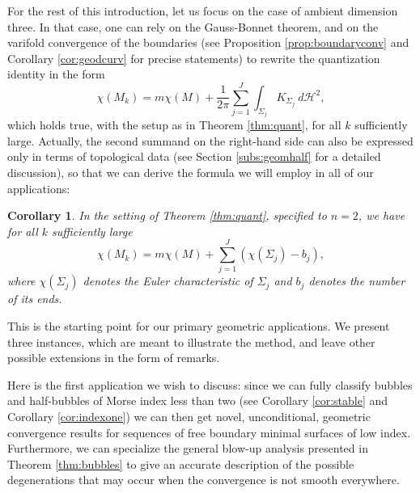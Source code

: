 \documentclass[JEP,XML,SOM,Unicode]{cedram}
\newcounter{cas}
\newtheorem{cor}[thm]{Corollary}
\theoremstyle{definition}
\newcommand{\h}{\mathscr{H}}
\newcommand{\rd}{\ d}
\begin{document}
For the rest of this introduction, let us focus on the case of ambient dimension three. In that case, one can rely on the Gauss-Bonnet theorem, and on the varifold convergence of the boundaries (see Proposition \ref{prop:boundaryconv} and Corollary \ref{cor:geodcurv} for precise statements) to rewrite the quantization identity in the form
\[
\chi(M_k) = m\chi(M) + \frac{1}{2\pi} \sum_{j=1}^J \int_{\Sigma_j} K_{\Sigma_j} \rd \h^2,
\]
which holds true, with the setup as in Theorem \ref{thm:quant}, for all $k$ sufficiently large. Actually, the second summand on the right-hand side can also be expressed only in terms of topological data (see Section \ref{subs:geomhalf} for a detailed discussion), so that we can derive the formula we will employ in all of our applications:

\begin{cor}\label{cor:chi}
In the setting of Theorem \ref{thm:quant}, specified to $n=2$, we have for all $k$ sufficiently large
\begin{equation*}\label{eq:topfundsymINTRO}
\chi(M_k)= m\chi(M)+ \sum_{j=1}^J (\chi(\Sigma_j)-b_j),
\end{equation*}
where $\chi(\Sigma_j)$ denotes the Euler characteristic of $\Sigma_j$ and $b_j$ denotes the number of its ends.
\end{cor}

This is the starting point for our primary geometric applications. We present three instances, which are meant to illustrate the method, and leave other possible extensions in the form of remarks.

Here is the first application we wish to discuss: since we can fully classify bubbles and half-bubbles of Morse index less than two (see Corollary \ref{cor:stable} and Corollary \ref{cor:indexone}) we can then get novel, unconditional, geometric convergence results for sequences of free boundary minimal surfaces of low index. Furthermore, we can specialize the general blow-up analysis presented in Theorem \ref{thm:bubbles} to give an accurate description of the possible degenerations that may occur when the convergence is not smooth everywhere.
\end{document}
